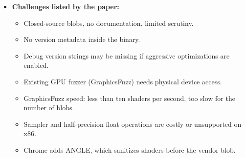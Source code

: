 \documentclass[11pt,a4paper]{article}
\begin{document}
\begin{enumerate}
\begin{itemize}[leftmargin=*, itemsep=1pt, topsep=2pt]
\begin{itemize}[itemsep=0pt]
            \item RQ2: How vulnerable are these GPU vendor blobs?
        \end{itemize}
        \item \textbf{Challenges listed by the paper:}
        \begin{itemize}[itemsep=0pt]
            \item Closed-source blobs, no documentation, limited scrutiny.
            \item No version metadata inside the binary.
            \item Debug version strings may be missing if aggressive optimizations are enabled.
            \item Existing GPU fuzzer (GraphicsFuzz) needs physical device access.
            \item GraphicsFuzz speed: less than ten shaders per second, too slow for the number of blobs.
            \item Sampler and half-precision float operations are costly or unsupported on x86.
            \item Chrome adds ANGLE, which sanitizes shaders before the vendor blob.
        \end{itemize}
    \end{itemize}


\end{enumerate}
\end{document}
